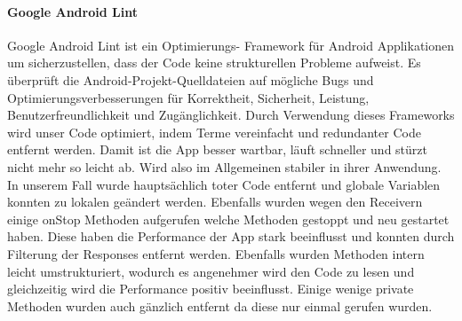 	\paragraph{Google Android Lint}
	Google Android Lint ist ein Optimierungs- Framework für Android Applikationen um sicherzustellen, dass der Code keine strukturellen Probleme aufweist. Es überprüft die Android-Projekt-Quelldateien auf mögliche Bugs und Optimierungsverbesserungen für Korrektheit, Sicherheit, Leistung, Benutzerfreundlichkeit und Zugänglichkeit.
	Durch Verwendung dieses Frameworks wird unser Code optimiert, indem Terme vereinfacht und redundanter Code entfernt werden. Damit ist die App besser wartbar, läuft schneller und stürzt nicht mehr so leicht ab. Wird also im Allgemeinen stabiler in ihrer Anwendung.
	In unserem Fall wurde hauptsächlich toter Code entfernt und globale Variablen konnten zu lokalen geändert werden. Ebenfalls wurden wegen den Receivern einige onStop Methoden aufgerufen welche Methoden gestoppt und neu gestartet haben. Diese haben die Performance der App stark beeinflusst und konnten durch Filterung der Responses entfernt werden. Ebenfalls wurden Methoden intern leicht umstrukturiert, wodurch es angenehmer wird den Code zu lesen und gleichzeitig wird die Performance positiv beeinflusst. Einige wenige private Methoden wurden auch gänzlich entfernt da diese nur einmal gerufen wurden.






